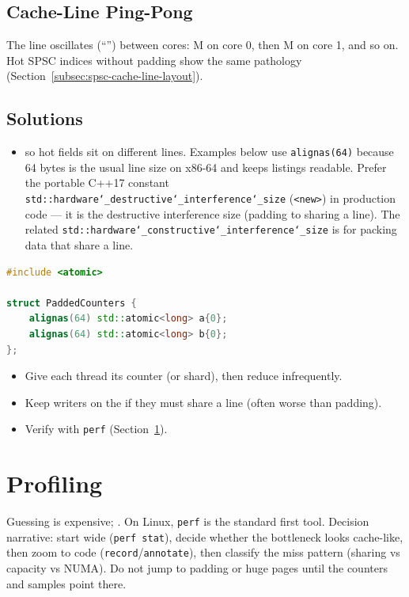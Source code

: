 \subsection{Cache-Line Ping-Pong}
\label{subsec:cache-line-ping-pong}
The line oscillates (``'') between cores: M on core 0, then M on core 1, 
and so on. Hot SPSC indices without padding show the same pathology 
(Section~\ref{subsec:spsc-cache-line-layout}).

\subsection{Solutions}
\label{subsec:false-sharing-solutions}
\begin{itemize}
    \item {} so hot fields sit on different lines. 
          Examples below use \texttt{alignas(64)} because 64 bytes is the usual 
          line size on x86-64 and keeps listings readable. Prefer the portable 
          C++17 constant \texttt{std::hardware\char`_destructive\char`_interference\char`_size} 
          (\texttt{<new>}) in production code --- it is the destructive interference size 
          (padding to  sharing a line). The related 
          \texttt{std::hardware\char`_constructive\char`_interference\char`_size} is for 
          packing data that  share a line.
\end{itemize}
\begin{lstlisting}[language=C++]
#include <atomic>

struct PaddedCounters {
    alignas(64) std::atomic<long> a{0};
    alignas(64) std::atomic<long> b{0};
};
\end{lstlisting}
\begin{itemize}
    \item Give each thread its  counter (or shard), then reduce infrequently.
    \item Keep writers on the  if they must share a line (often worse than padding).
    \item Verify with \texttt{perf} (Section~\ref{sec:cache-profiling}).
\end{itemize}

\section{Profiling}
\label{sec:cache-profiling}
Guessing is expensive; . On Linux, \texttt{perf} is the standard first tool.
\newline
Decision narrative: start wide (\texttt{perf stat}), decide whether the bottleneck looks 
cache-like, then zoom to code (\texttt{record}/\texttt{annotate}), then classify the miss 
pattern (sharing vs capacity vs NUMA). Do not jump to padding or huge pages until the 
counters and samples point there.

